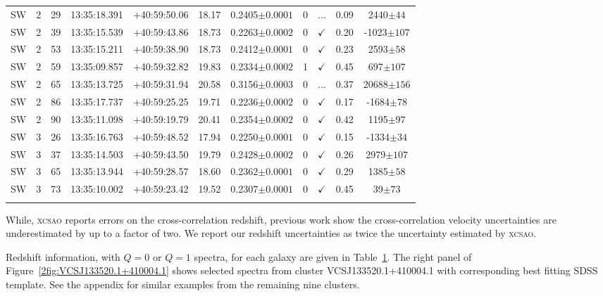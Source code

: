 \begin{landscape}
\begin{longtable}{ccccccccccc}
		SW & 2 & 29 & 13:35:18.391 & +40:59:50.06 & 18.17 & 0.2405$\pm{0.0001}$ & 0 & ... & 0.09 & 2440$\pm{44}$ \\
		SW & 2 & 39 & 13:35:15.539 & +40:59:43.86 & 18.73 & 0.2263$\pm{0.0002}$ & 0 & $\checkmark$ & 0.20 & -1023$\pm{107}$ \\
		SW & 2 & 53 & 13:35:15.211 & +40:59:38.90 & 18.73 & 0.2412$\pm{0.0001}$ & 0 & $\checkmark$ & 0.23 & 2593$\pm{58}$ \\
		SW & 2 & 59 & 13:35:09.857 & +40:59:32.82 & 19.83 & 0.2334$\pm{0.0002}$ & 1 & $\checkmark$ & 0.45 & 697$\pm{107}$ \\
		SW & 2 & 65 & 13:35:13.725 & +40:59:31.94 & 20.58 & 0.3156$\pm{0.0003}$ & 0 & ... & 0.37 & 20688$\pm{156}$ \\
		SW & 2 & 86 & 13:35:17.737 & +40:59:25.25 & 19.71 & 0.2236$\pm{0.0002}$ & 0 & $\checkmark$ & 0.17 & -1684$\pm{78}$ \\
		SW & 2 & 90 & 13:35:11.098 & +40:59:19.79 & 20.41 & 0.2354$\pm{0.0002}$ & 0 & $\checkmark$ & 0.42 & 1195$\pm{97}$ \\
		SW & 3 & 26 & 13:35:16.763 & +40:59:48.52 & 17.94 & 0.2250$\pm{0.0001}$ & 0 & $\checkmark$ & 0.15 & -1334$\pm{34}$ \\
		SW & 3 & 37 & 13:35:14.503 & +40:59:43.50 & 19.79 & 0.2428$\pm{0.0002}$ & 0 & $\checkmark$ & 0.26 & 2979$\pm{107}$ \\
		SW & 3 & 65 & 13:35:13.944 & +40:59:28.57 & 18.60 & 0.2362$\pm{0.0001}$ & 0 & $\checkmark$ & 0.29 & 1385$\pm{58}$ \\
		SW & 3 & 73 & 13:35:10.002 & +40:59:23.42 & 19.52 & 0.2307$\pm{0.0001}$ & 0 & $\checkmark$ & 0.45 & 39$\pm{73}$ \\
	\hline 
	\label{2tbl:VCSJ133520.1+410004.1} 
	\end{longtable}
\end{landscape}

While, \textsc{xcsao} reports errors on the cross-correlation redshift, previous work  show the cross-correlation velocity uncertainties are underestimated by up to a factor of two. We report our redshift uncertainties as twice the uncertainty estimated by \textsc{xcsao}.

Redshift information, with $Q=0$ or $Q=1$ spectra, for each galaxy are given in Table~\ref{2tbl:VCSJ133520.1+410004.1}. The right panel of Figure~\ref{2fig:VCSJ133520.1+410004.1} shows selected spectra from cluster VCSJ133520.1+410004.1 with corresponding best fitting SDSS template. See the appendix for similar examples from the remaining nine clusters.

